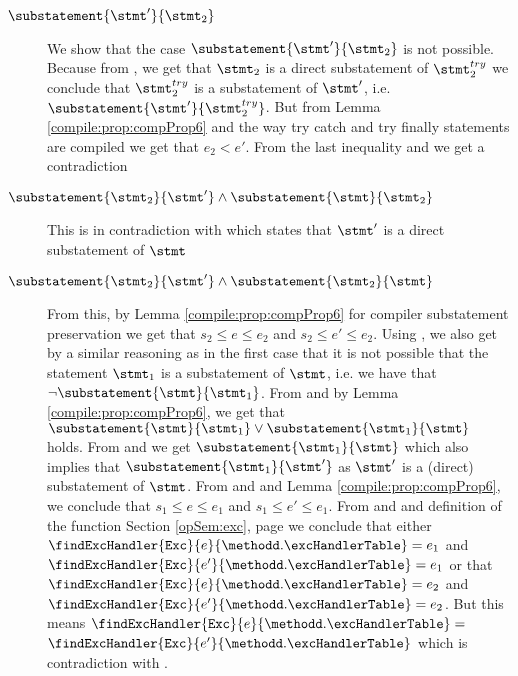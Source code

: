 \begin{description}
  \item[$ \substatement{\stmt'}{\stmt_2}  $] 
       We show that the case $\substatement{\stmt'}{\stmt_2}$ is not possible. 
       Because from , we get that  $ \stmt_2$ is a direct substatement of $\stmt^{try}_2$ we conclude that
       $\stmt^{try}_2 $ is a substatement of $\stmt'$, i.e.    $\substatement{\stmt'}{ \stmt^{try}_2  }$.
       But from Lemma \ref{compile:prop:compProp6} and the way try catch  and try finally statements are compiled
       we get that $e_2 <  e'$. From the last inequality and  we get  a contradiction
       
  \item[$\substatement{\stmt_2} {\stmt'} \wedge \substatement{\stmt}{\stmt_2}    $] 
       This is in contradiction with   which states that $\stmt'$ is a direct substatement 
       of  $\stmt$

  \item[$ \substatement{\stmt_2} {\stmt'} \wedge \substatement{\stmt_2}{\stmt}  $] 
       From this, by Lemma \ref{compile:prop:compProp6} for compiler substatement preservation  we get that
           $s_2 \le e \le e_2$ and $s_2 \le e' \le e_2 $.
       Using , we also get by a similar reasoning as in the first case that 
       it is not possible that the statement $\stmt_1$ is a substatement of $\stmt$, i.e. we have that
        $\neg \substatement{\stmt}{\stmt_1}$. From  and  by Lemma 
       \ref{compile:prop:compProp6}, we get that    $ \substatement{\stmt}{\stmt_1} \vee \substatement{\stmt_1}{\stmt} $ holds.
       From   and   we get   $ \substatement{\stmt_1}{\stmt}$ which also implies that 
        $ \substatement{\stmt_1}{\stmt'}$ as $\stmt'$ is a (direct) substatement of $\stmt$. 
       From    and  and  Lemma \ref{compile:prop:compProp6}, we conclude that   
           $s_1 \le e \le e_1$ and $s_1 \le e' \le e_1$. From   and  and 
       definition of the function \findExcHandlerOnly{}  Section \ref{opSem:exc}, page \pageref{opSem:exc} we conclude that either
       $\findExcHandler{\mbox{\rm\tt{Exc}} }{e}{\methodd.\excHandlerTable} =  e_1 $ and 
        $\findExcHandler{\mbox{\rm\tt{Exc}} }{e'}{\methodd.\excHandlerTable} =  e_1 $
	or that \\
         $\findExcHandler{\mbox{\rm\tt{Exc}} }{e}{\methodd.\excHandlerTable} =  e_2 $ and 
        $\findExcHandler{\mbox{\rm\tt{Exc}} }{e'}{\methodd.\excHandlerTable} =  e_2 $. But this means 
	 $\findExcHandler{\mbox{\rm\tt{Exc}} }{e}{\methodd.\excHandlerTable} = $\\
	  $\findExcHandler{\mbox{\rm\tt{Exc}} }{e'}{\methodd.\excHandlerTable}$
	 which is contradiction with .
	
 
      
\end{description}



